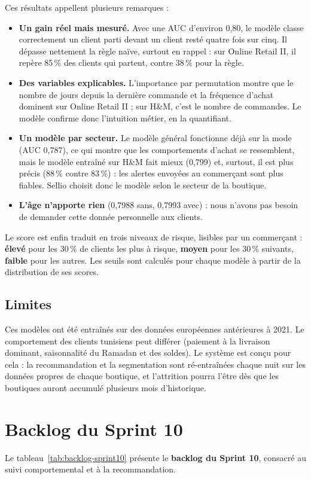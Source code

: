 Ces résultats appellent plusieurs remarques :
\begin{itemize}
  \item \textbf{Un gain réel mais mesuré.} Avec une AUC d'environ 0,80, le modèle classe correctement un client parti devant un client resté quatre fois sur cinq. Il dépasse nettement la règle naïve, surtout en rappel : sur Online Retail II, il repère 85\,\% des clients qui partent, contre 38\,\% pour la règle.
  \item \textbf{Des variables explicables.} L'importance par permutation montre que le nombre de jours depuis la dernière commande et la fréquence d'achat dominent sur Online Retail II ; sur H\&M, c'est le nombre de commandes. Le modèle confirme donc l'intuition métier, en la quantifiant.
  \item \textbf{Un modèle par secteur.} Le modèle général fonctionne déjà sur la mode (AUC 0,787), ce qui montre que les comportements d'achat se ressemblent, mais le modèle entraîné sur H\&M fait mieux (0,799) et, surtout, il est plus précis (88\,\% contre 83\,\%) : les alertes envoyées au commerçant sont plus fiables. Sellio choisit donc le modèle selon le secteur de la boutique.
  \item \textbf{L'âge n'apporte rien} (0,7988 sans, 0,7993 avec) : nous n'avons pas besoin de demander cette donnée personnelle aux clients.
\end{itemize}
Le score est enfin traduit en trois niveaux de risque, lisibles par un commerçant : \textbf{élevé} pour les 30\,\% de clients les plus à risque, \textbf{moyen} pour les 30\,\% suivants, \textbf{faible} pour les autres. Les seuils sont calculés pour chaque modèle à partir de la distribution de ses scores.

\subsection{Limites}
Ces modèles ont été entraînés sur des données européennes antérieures à 2021. Le comportement des clients tunisiens peut différer (paiement à la livraison dominant, saisonnalité du Ramadan et des soldes). Le système est conçu pour cela : la recommandation et la segmentation sont ré-entraînées chaque nuit sur les données propres de chaque boutique, et l'attrition pourra l'être dès que les boutiques auront accumulé plusieurs mois d'historique.

\section{Backlog du Sprint 10}
Le tableau~\ref{tab:backlog-sprint10} présente le \textbf{backlog du Sprint 10}, consacré au suivi comportemental et à la recommandation.

